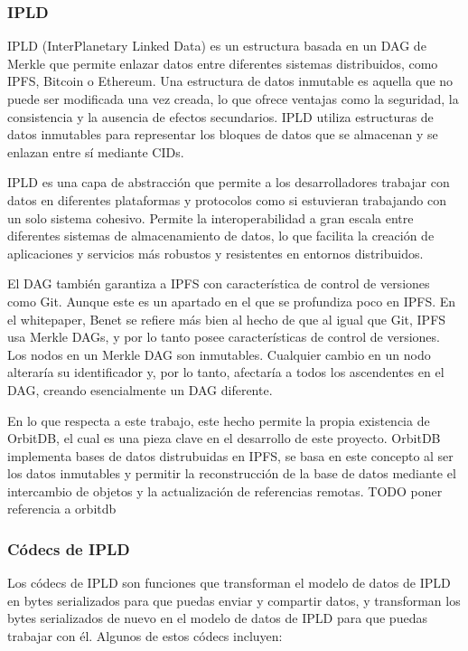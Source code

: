 \subsubsection{IPLD}
IPLD (InterPlanetary Linked Data)\cite{IPLDDocs} es un estructura basada en un DAG de Merkle que permite enlazar datos entre diferentes sistemas
distribuidos, como IPFS, Bitcoin o Ethereum. Una estructura de datos inmutable es aquella que no puede ser modificada una vez creada, lo que ofrece
ventajas como la seguridad, la consistencia y la ausencia de efectos secundarios. IPLD utiliza estructuras de datos inmutables para representar los
bloques de datos que se almacenan y se enlazan entre sí mediante CIDs.

IPLD es una capa de abstracción que permite a los desarrolladores trabajar con datos en diferentes plataformas y protocolos como si estuvieran trabajando con un solo sistema cohesivo. Permite la interoperabilidad a gran escala entre diferentes sistemas de almacenamiento de datos, lo que facilita la creación de aplicaciones y servicios más robustos y resistentes en entornos distribuidos.

El DAG también garantiza a IPFS con característica de control de versiones como Git. Aunque este es un apartado en el que se profundiza poco en IPFS.
En el whitepaper, Benet se refiere más bien al hecho de que al igual que Git, IPFS usa Merkle DAGs, y por lo tanto posee características de
control de versiones. Los nodos en un Merkle DAG son inmutables. Cualquier cambio en un nodo alteraría su identificador y, por lo tanto, afectaría a
todos los ascendentes en el DAG, creando esencialmente un DAG diferente.

En lo que respecta a este trabajo, este hecho permite la propia existencia de OrbitDB, el cual es una pieza clave en el desarrollo de este proyecto. OrbitDB implementa bases de datos distrubuidas en IPFS, se basa en este concepto al ser los datos inmutables y permitir la reconstrucción de la base de datos mediante el intercambio de objetos y la actualización de referencias remotas.
TODO poner referencia a orbitdb

\subsubsection{Códecs de IPLD}

Los códecs de IPLD son funciones que transforman el modelo de datos de IPLD en bytes serializados para que puedas enviar y compartir datos, y transforman los
bytes serializados de nuevo en el modelo de datos de IPLD para que puedas trabajar con él. Algunos de estos códecs incluyen:

